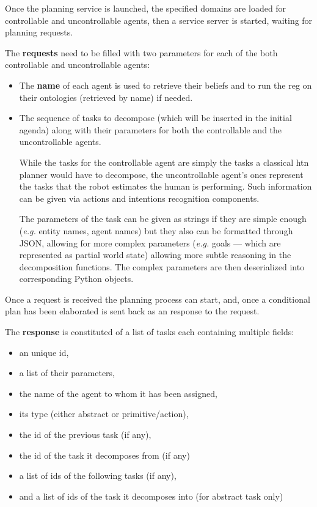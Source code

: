 \documentclass[a4paper,11pt,twoside]{StyleThese}
\begin{document}
Once the planning service is launched, the specified domains are loaded for controllable and uncontrollable agents, then a service server is started, waiting for planning requests. 

The \textbf{requests} need to be filled with two parameters for each of the both controllable and uncontrollable agents:
\begin{itemize}
\item The \textbf{name} of each agent is used to retrieve their beliefs and to run the \acrshort{reg} on their ontologies (retrieved by name) if needed.

\item The sequence of tasks to decompose (which will be inserted in the initial agenda) along with their parameters for both the controllable and the uncontrollable agents. 

While the tasks for the controllable agent are simply the tasks a classical \acrshort{htn} planner would have to decompose, the uncontrollable agent's ones represent the tasks that the robot estimates the human is performing. Such information can be given via actions and intentions recognition components. 

The parameters of the task can be given as strings if they are simple enough (\textit{e.g.} entity names, agent names) but they also can be formatted through JSON, allowing for more complex parameters (\textit{e.g.} goals --- which are represented as partial world state) allowing more subtle reasoning in the decomposition functions. The complex parameters are then deserialized into corresponding Python objects.
\end{itemize}

Once a request is received the planning process can start, and, once a conditional plan has been elaborated is sent back as an response to the request. 

The \textbf{response} is constituted of a list of tasks each containing multiple fields: 
\begin{itemize}
\item an unique id,

\item a list of their parameters,

\item the name of the agent to whom it has been assigned,

\item its type (either abstract or primitive/action),

\item the id of the previous task (if any),

\item the id of the task it decomposes from (if any)

\item a list of ids of the following tasks (if any),

\item and a list of ids of the task it decomposes into (for abstract task only)
\end{itemize}
\end{document}
